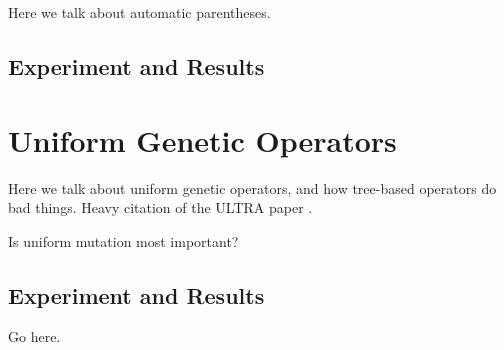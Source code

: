 Here we talk about automatic parentheses.


\subsection{Experiment and Results}


\section{Uniform Genetic Operators}

Here we talk about uniform genetic operators, and how tree-based operators do bad things. Heavy citation of the ULTRA paper \citep{Spector:2013:GPTP}.

Is uniform mutation most important?


\subsection{Experiment and Results}








\begin{acknowledgement}
Go here.
\end{acknowledgement}
%




